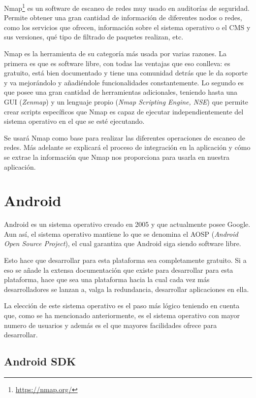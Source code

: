Nmap\footnote{\url{https://nmap.org/}} es un software de escaneo de redes muy usado en auditorías de seguridad. Permite obtener una gran cantidad de información de diferentes nodos o redes, como los servicios que ofrecen, información sobre el sistema operativo o el CMS y sus versiones, qué tipo de filtrado de paquetes realizan, etc.

Nmap es la herramienta de su categoría más usada por varias razones. La primera es que es software libre, con todas las ventajas que eso conlleva: es gratuito, está bien documentado y tiene una comunidad detrás que le da soporte y va mejorándolo y añadiéndole funcionalidades constantemente. Lo segundo es que posee una gran cantidad de herramientas adicionales, teniendo hasta una GUI (\textit{Zenmap}) y un lenguaje propio (\textit{Nmap Scripting Engine, NSE}) que permite crear scripts específicos que Nmap es capaz de ejecutar independientemente del sistema operativo en el que se esté ejecutando.

Se usará Nmap como base para realizar las diferentes operaciones de escaneo de redes. Más adelante se explicará el proceso de integración en la aplicación y cómo se extrae la información que Nmap nos proporciona para usarla en nuestra aplicación.


\section{Android}

Android es un sistema operativo creado en 2005 y que actualmente posee Google. Aun así, el sistema operativo mantiene lo que se denomina el AOSP (\textit{Android Open Source Project}), el cual garantiza que Android siga siendo software libre.

Esto hace que desarrollar para esta plataforma sea completamente gratuito. Si a eso se añade la extensa documentación que existe para desarrollar para esta plataforma, hace que sea una plataforma hacia la cual cada vez más desarrolladores se lanzan a, valga la redundancia, desarrollar aplicaciones en ella.

La elección de este sistema operativo es el paso más lógico teniendo en cuenta que, como se ha mencionado anteriormente, es el sistema operativo con mayor numero de usuarios y además es el que mayores facilidades ofrece para desarrollar.

\subsection{Android SDK}


